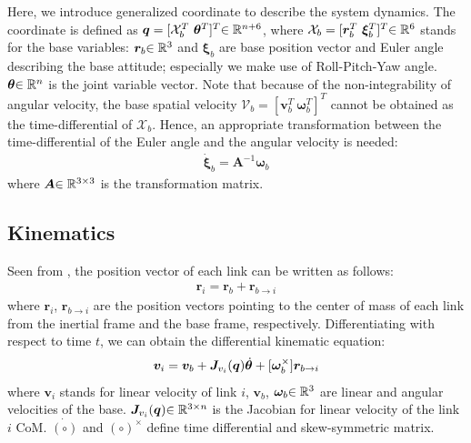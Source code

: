 Here, we introduce generalized coordinate to describe the system dynamics.
The coordinate is defined as $\bm{q} = [\mathcal{X}_{b}^{T}~{\bm{\theta}}^{T}]^{T}{\in\mathbb{R}^{n + 6}}$,
where $\mathcal{X}_{b} = [\bm{r}_{b}^{T}~\bm{\xi}_{b}^{T}]^{T}{\in\mathbb{R}^{6}}$ stands for the base variables:
$\bm{r}_{b}{\in\mathbb{R}^{3}}$ and $\bm{\xi}_{b}$ are base position vector and Euler angle describing the base attitude;
especially we make use of Roll-Pitch-Yaw angle.
${\bm{\theta}}{\in\mathbb{R}^{n}}$ is the joint variable vector.
Note that because of the non-integrability of angular velocity,
the base spatial velocity $\mathcal{V}_{b} = [\bm{v}_{b}^{T}~\bm{\omega}_{b}^{T}]^{T}$ cannot be obtained
as the time-differential of $\mathcal{X}_{b}$.
Hence, an appropriate transformation between the time-differential of the Euler angle and the angular velocity is needed:
%
\begin{align}
  \dot{\bm{\xi}}_{b} = \bm{A}^{-1}\bm{\omega}_{b}
\end{align}
%
where $\bm{A}{\in\mathbb{R}^{3 \times 3}}$ is the transformation matrix.




\subsection{Kinematics}
Seen from ,
the position vector of each link can be written as follows:
%
\begin{align}
  \bm{r}_{i} = \bm{r}_{b} + \bm{r}_{b \rightarrow i}\label{eq:POS_LINKi}
\end{align}
%
where $\bm{r}_{i}$, $\bm{r}_{b \rightarrow i}$ are the position vectors pointing to the center of mass of each link
from the inertial frame and the base frame, respectively.
Differentiating  with respect to time $t$,
we can obtain the differential kinematic equation:
%
\begin{align}
  \bm{v}_{i} = \bm{v}_{b} + \bm{J}_{v_{i}}(\bm{q}){\dot{\bm{\theta}}} + [\bm{\omega}_{b}^{\times}]\bm{r}_{b \rightarrow i}\label{eq:VEL_LINKi}
\end{align}
%
where $\bm{v}_{i}$ stands for linear velocity of link $i$,
$\bm{v}_{b}$, $\bm{\omega}_{b}{\in\mathbb{R}^{3}}$ are linear and angular velocities of the base.
$\bm{J}_{v_{i}}(\bm{q}){\in\mathbb{R}^{3 \times n}}$ is the Jacobian for linear velocity of the link $i$ CoM.
$\dot{(\circ)}$ and $(\circ)^{\times}$ define time differential and skew-symmetric matrix.

